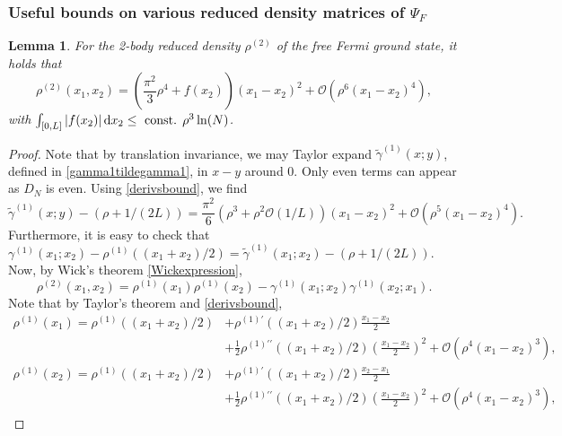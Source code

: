 \documentclass[a4paper,11pt]{article}
\newcommand{\abs}[1]{\left\lvert #1 \right\rvert}
\newcommand*\diff{\mathop{}\!\mathrm{d}}
\newtheorem{lemma}[theorem]{Lemma}
\numberwithin{equation}{section}
\begin{document}
	
	
	\subsubsection{Useful bounds on various reduced density matrices of $\Psi_F$}
	\begin{lemma}\label{Lemma rho2 bound}
		For the 2-body reduced density $\rho^{(2)}$ of the free Fermi ground state, it holds that
		\begin{equation}
			\rho^{(2)}(x_1,x_2)=\left(\frac{\pi^2}{3}\rho^4+f(x_2)\right)(x_1-x_2)^2+\mathcal{O}(\rho^6(x_1-x_2)^4), 
		\end{equation} with $ \int_{[0,L]}\abs{f(x_2)}\diff x_2\leq \textnormal{ const. }\rho^3\ln(N) $.
	\end{lemma}
	\begin{proof}
		Note that by translation invariance, we may Taylor expand $\tilde{\gamma}^{(1)}(x;y)$, defined in \eqref{gamma1tildegamma1}, in $x-y$ around $0$. Only even terms can appear as $D_N$ is even. Using \eqref{derivsbound}, we find \begin{equation}\label{EqGammaTaylorExpansion}
			\tilde{\gamma}^{(1)}(x;y)-(\rho+1/(2L))=\frac{\pi^2}{6}(\rho^3+\rho^2\mathcal{O}(1/L))(x_1-x_2)^2+\mathcal{O}(\rho^5(x_1-x_2)^4).
		\end{equation}
		Furthermore, it is easy to check that $ \gamma^{(1)}(x_1;x_2)-\rho^{(1)}\left((x_1+x_2)/2\right)=\tilde{\gamma}^{(1)}(x_1;x_2)-(\rho+1/(2L)) $. Now, by Wick's theorem \eqref{Wickexpression},  \begin{equation}
			\rho^{(2)}(x_1,x_2)=\rho^{(1)}(x_1)\rho^{(1)}(x_2)-\gamma^{(1)}(x_1;x_2)\gamma^{(1)}(x_2;x_1).
		\end{equation}
		Note that by Taylor's theorem and \eqref{derivsbound},
		\begin{equation}
			\begin{aligned}
				\rho^{(1)}(x_1)=\rho^{(1)}((x_1+x_2)/2)&+\rho^{(1)\prime}((x_1+x_2)/2)\frac{x_1-x_2}{2}\\&+\frac{1}{2}\rho^{(1)\prime\prime}((x_1+x_2)/2)\left(\frac{x_1-x_2}{2}\right)^2+\mathcal{O}(\rho^4(x_1-x_2)^3),
			\end{aligned}
		\end{equation}
		\begin{equation}
			\begin{aligned}
				\rho^{(1)}(x_2)=\rho^{(1)}((x_1+x_2)/2)&+\rho^{(1)\prime}((x_1+x_2)/2)\frac{x_2-x_1}{2}\\&+\frac{1}{2}\rho^{(1)\prime\prime}((x_1+x_2)/2)\left(\frac{x_1-x_2}{2}\right)^2+\mathcal{O}(\rho^4(x_1-x_2)^3),

\end{aligned}
\end{equation}
\end{proof}
\end{document}

